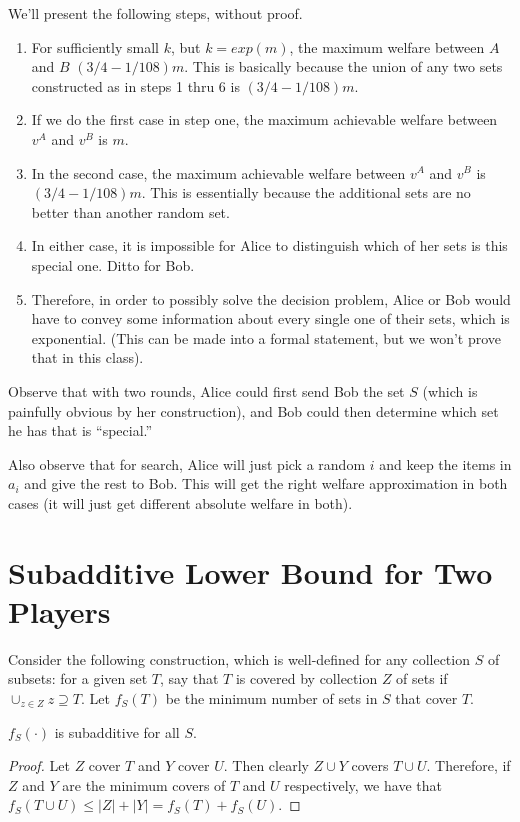 We'll present the following steps, without proof.
\begin{enumerate}
\item For sufficiently small $k$, but $k = exp(m)$, the maximum welfare between $A$ and $B$ $(3/4-1/108)m$. This is basically because the union of any two sets constructed as in steps 1 thru 6 is $(3/4-1/108)m$. 
\item If we do the first case in step one, the maximum achievable welfare between $v^A$ and $v^B$ is $m$.
\item In the second case, the maximum achievable welfare between $v^A$ and $v^B$ is $(3/4-1/108)m$. This is essentially because the additional sets are no better than another random set.
\item In either case, it is impossible for Alice to distinguish which of her sets is this special one. Ditto for Bob.
\item Therefore, in order to possibly solve the decision problem, Alice or Bob would have to convey some information about every single one of their sets, which is exponential. (This can be made into a formal statement, but we won't prove that in this class). 
\end{enumerate}

Observe that with two rounds, Alice could first send Bob the set $S$ (which is painfully obvious by her construction), and Bob could then determine which set he has that is ``special.''

Also observe that for search, Alice will just pick a random $i$ and keep the items in $a_i$ and give the rest to Bob. This will get the right welfare approximation in both cases (it will just get different absolute welfare in both). 

\section{Subadditive Lower Bound for Two Players}
Consider the following construction, which is well-defined for any collection $S$ of subsets: for a given set $T$, say that $T$ is covered by collection $Z$ of sets if $\cup_{z \in Z} z \supseteq T$. Let $f_S(T)$ be the minimum number of sets in $S$ that cover $T$. 

\begin{lemma}$f_S(\cdot)$ is subadditive for all $S$.
\end{lemma}
\begin{proof}
Let $Z$ cover $T$ and $Y$ cover $U$. Then clearly $Z \cup Y$ covers $T \cup U$. Therefore, if $Z$ and $Y$ are the minimum covers of $T$ and $U$ respectively, we have that $f_S(T \cup U) \leq |Z|+|Y| = f_S(T) + f_S(U)$.
\end{proof}

